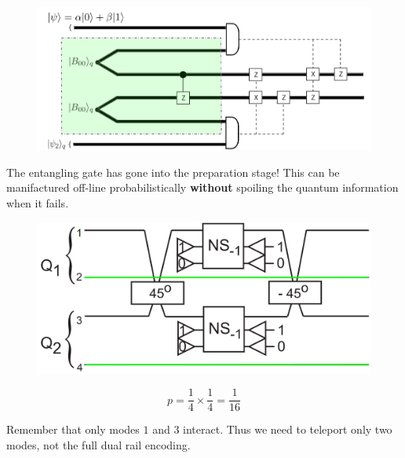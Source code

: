 \documentclass{beamer}
\begin{document}
\begin{frame}
\begin{center}

\begin{figure}[!htb]
\centering
\includegraphics[scale=.20]{immagini/tele2.png}
\end{figure}
\vspace{20pt}
The entangling gate has gone into the preparation stage! This can be manifactured  off-line probabilistically \textbf{without} spoiling the quantum information when it fails.\\

\end{center}
\end{frame}

\begin{frame}
\begin{center}

\begin{figure}[!htb]
\centering
\includegraphics[scale=.25]{immagini/railColour.png}
\end{figure}
\begin{equation*}
p = \frac{1}{4} \times \frac{1}{4} = \frac{1}{16}
\end{equation*}

Remember that only modes $1$ and $3$ interact. Thus we need to teleport only two modes, not the full dual rail encoding.\\

\end{center}
\end{frame}
\end{document}

